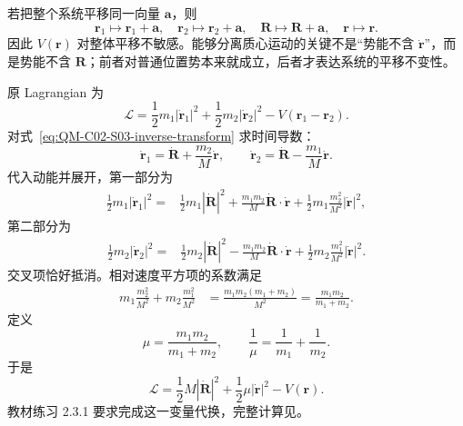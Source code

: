 若把整个系统平移同一向量 $\bm a$，则
\begin{equation}
  \bm r_1\mapsto\bm r_1+\bm a,
  \quad
  \bm r_2\mapsto\bm r_2+\bm a,
  \quad
  \bm R\mapsto\bm R+\bm a,
  \quad
  \bm r\mapsto\bm r.
  \label{eq:QM-C02-S03-translation}
\end{equation}
因此 $V(\bm r)$ 对整体平移不敏感。能够分离质心运动的关键不是“势能不含 $\dot{\bm r}$”，而是势能不含 $\bm R$；前者对普通位置势本来就成立，后者才表达系统的平移不变性。


原 Lagrangian 为
\begin{equation}
  \mathcal L
  =\frac12m_1|\dot{\bm r}_1|^2
  +\frac12m_2|\dot{\bm r}_2|^2
  -V(\bm r_1-\bm r_2).
  \label{eq:QM-C02-S03-original-lagrangian}
\end{equation}
对式~\eqref{eq:QM-C02-S03-inverse-transform} 求时间导数：
\begin{equation}
  \dot{\bm r}_1=\dot{\bm R}+\frac{m_2}{M}\dot{\bm r},
  \qquad
  \dot{\bm r}_2=\dot{\bm R}-\frac{m_1}{M}\dot{\bm r}.
  \label{eq:QM-C02-S03-velocity-transform}
\end{equation}
代入动能并展开，第一部分为
\begin{align}
  \frac12m_1|\dot{\bm r}_1|^2
  ={}&\frac12m_1|\dot{\bm R}|^2
  +\frac{m_1m_2}{M}\dot{\bm R}\cdot\dot{\bm r}
  +\frac12m_1\frac{m_2^2}{M^2}|\dot{\bm r}|^2,
  \label{eq:QM-C02-S03-first-kinetic-expansion}
\end{align}
第二部分为
\begin{align}
  \frac12m_2|\dot{\bm r}_2|^2
  ={}&\frac12m_2|\dot{\bm R}|^2
  -\frac{m_1m_2}{M}\dot{\bm R}\cdot\dot{\bm r}
  +\frac12m_2\frac{m_1^2}{M^2}|\dot{\bm r}|^2.
  \label{eq:QM-C02-S03-second-kinetic-expansion}
\end{align}
交叉项恰好抵消。相对速度平方项的系数满足
\begin{align}
  m_1\frac{m_2^2}{M^2}+m_2\frac{m_1^2}{M^2}
  &=\frac{m_1m_2(m_1+m_2)}{M^2}
   =\frac{m_1m_2}{m_1+m_2}.
  \label{eq:QM-C02-S03-reduced-mass-coefficient}
\end{align}
定义
\begin{equation}
  \boxed{
  \mu=\frac{m_1m_2}{m_1+m_2},
  \qquad
  \frac1\mu=\frac1{m_1}+\frac1{m_2}.}
  \label{eq:QM-C02-S03-reduced-mass}
\end{equation}
于是
\begin{equation}
  \boxed{
  \mathcal L
  =\frac12M|\dot{\bm R}|^2
  +\frac12\mu|\dot{\bm r}|^2
  -V(\bm r).}
  \label{eq:QM-C02-S03-separated-lagrangian}
\end{equation}
教材练习 2.3.1 要求完成这一变量代换，完整计算见。

